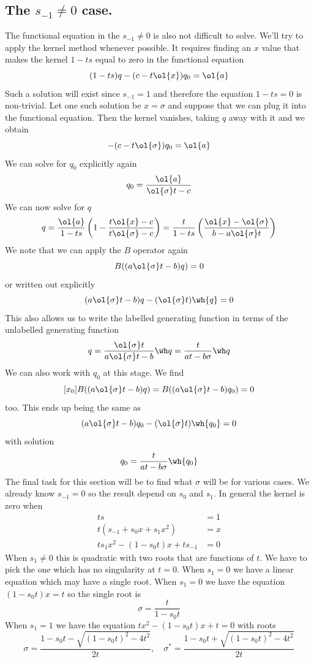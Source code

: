 \subsection{The $s_{-1} \neq 0$ case.}
The functional equation in the $s_{-1} \neq 0$ is also not difficult to solve. We'll try to apply the kernel method whenever possible. It requires finding an $x$ value that makes the kernel $1 - ts$ equal to zero in the functional equation
\[
	(1-ts)q - (c -t\ol{x})q_0 = \ol{a}
\]
Such a solution will exist since $s_{-1} = 1$ and therefore the equation $1 - ts = 0$ is non-trivial. Let one such solution be $x = \sigma$ and suppose that we can plug it into the functional equation. Then the kernel vanishes, taking $q$ away with it and we obtain
\[
	- (c - t\ol{\sigma})q_0 = \ol{a}
\]
We can solve for $q_0$ explicitly again
\[
	q_0 = \frac{\ol{a}}{\ol{\sigma}t-c}
\]
We can now solve for $q$
\[
	q = \frac{\ol{a}}{1-ts}\left(1 - \frac{t\ol{x}-c}{t\ol{\sigma}-c}\right) = \frac{t}{1-ts}\left(\frac{\ol{x}-\ol{\sigma}}{b-a\ol{\sigma}t}\right)
\]
We note that we can apply the $B$ operator again
\[
	B((a\ol{\sigma}t-b)q) = 0
\]
or written out explicitly
\[
	(a\ol{\sigma}t-b)q - (\ol{\sigma}t)\wh{q} = 0
\]
This also allows us to write the labelled generating function in terms of the unlabelled generating function
\[
	q = \frac{\ol{\sigma}t}{a\ol{\sigma}t-b}\wh q =  \frac{t}{at-b\sigma}\wh q
\]
We can also work with $q_0$ at this stage. We find
\[
	[x_0]B((a\ol{\sigma}t-b)q) = B((a\ol{\sigma}t-b)q_0) = 0
\]
too. This ends up being the same as
\[
	(a\ol{\sigma}t-b)q_0 - (\ol{\sigma}t)\wh{q_0} = 0
\]
with solution
\[
	q_0 = \frac{t}{at-b\sigma}\wh{q_0}
\]
The final task for this section will be to find what $\sigma$ will be for various cases. We already know $s_{-1} = 0$ so the result depend on $s_0$ and $s_1$. In general the kernel is zero when
\begin{align*}
	t s &= 1\\
	t(s_{-1} + s_0 x + s_1 x^2) &= x\\
	ts_1 x^2 -(1-s_0t)x + ts_{-1} &= 0
\end{align*}
When $s_1 \neq 0$ this is quadratic with two roots that are functions of $t$. We have to pick the one which has no singularity at $t = 0$. When $s_1 = 0$ we have a linear equation which may have a single root.
When $s_1 = 0$ we have the equation $(1-s_0t)x = t$ so the single root is
\[
	\sigma = \frac{t}{1-s_0t}
\]
When $s_1 = 1$ we have the equation $tx^2 -(1-s_0t)x + t = 0$ with roots
\[
\sigma = \frac{1-s_0t - \sqrt{(1-s_0t)^2-4t^2}}{2t}, \quad \sigma^\ast = \frac{1-s_0t + \sqrt{(1-s_0t)^2-4t^2}}{2t}
\]
